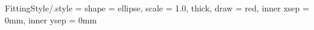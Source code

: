 \tikzset
{
FittingStyle/.style =
{
shape = ellipse,                            %
scale           = 1.0,                  %
thick,                                  %
%
draw            = red,              %
%
inner xsep      = 0mm,                  %
inner ysep      = 0mm                   %
}
}



